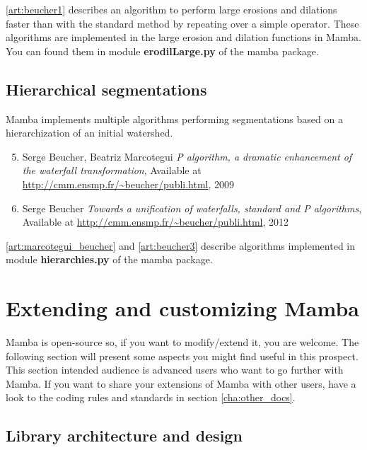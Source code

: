 \documentclass[a4paper,10pt,oneside]{article}
\begin{document}
\ref{art:beucher1} describes an algorithm to perform large erosions and
dilations faster than with the standard method by repeating over a simple
operator. These algorithms are implemented in the large erosion and dilation
functions in Mamba. You can found them in module \textbf{erodilLarge.py} of
the mamba package.

\subsection{Hierarchical segmentations}
\label{cha:hierar_seg}

Mamba implements multiple algorithms performing segmentations based on
a hierarchization of an initial watershed.

\begin{enumerate}
\setcounter{enumi}{4}
\item \label{art:marcotegui_beucher} Serge Beucher, Beatriz Marcotegui
\emph{P algorithm, a dramatic enhancement of the waterfall transformation},
Available at \url{http://cmm.ensmp.fr/~beucher/publi.html}, 2009

\item \label{art:beucher3} Serge Beucher
\emph{Towards a unification of waterfalls, standard and P algorithms},
Available at \url{http://cmm.ensmp.fr/~beucher/publi.html}, 2012
\end{enumerate}

\ref{art:marcotegui_beucher} and \ref{art:beucher3} describe algorithms
implemented in module \textbf{hierarchies.py} of the mamba package.

\pagebreak

\section{Extending and customizing Mamba}

Mamba is open-source so, if you want to modify/extend it, you are welcome. The
following section will present some aspects you might find useful in this
prospect. This section intended audience is advanced users who want to go 
further with Mamba. If you want to share your extensions of Mamba with other users,
have a look to the coding rules and standards in section \ref{cha:other_docs}. 

\subsection{Library architecture and design}
\label{cha:lib_arch}
\end{document}

